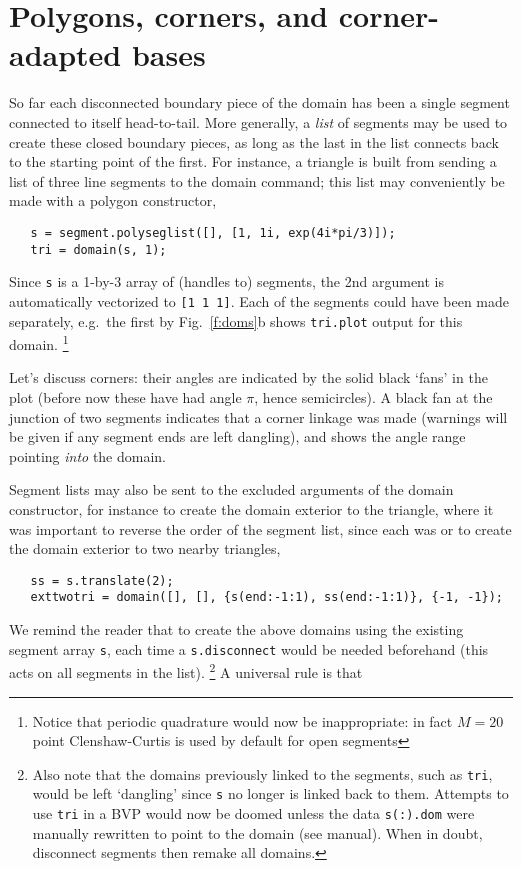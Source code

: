 \documentclass[11pt]{article}
\begin{document}
\section{Polygons, corners, and corner-adapted bases}
\label{s:poly}

So far each disconnected boundary piece of the domain
has been a single segment connected to itself head-to-tail.
More generally, a {\em list} of segments may be used to create 
these closed boundary pieces, as long as the last in the list
connects back to the starting point of the first.
For instance, a triangle is built from sending a list of
three line segments to the domain command;
this list may conveniently be made with a polygon constructor,
\begin{verbatim}
   s = segment.polyseglist([], [1, 1i, exp(4i*pi/3)]);
   tri = domain(s, 1);
\end{verbatim}
Since {\tt s} is a 1-by-3 array of (handles to) segments,
the 2nd argument is automatically vectorized to {\tt [1 1 1]}.
Each of the segments could have been made separately, e.g.\ the first by
Fig.~\ref{f:doms}b shows {\tt tri.plot} output for this domain.%
  \footnote{Notice that periodic quadrature would now be inappropriate:
    in fact $M=20$ point Clenshaw-Curtis is used by default for open
    segments}

Let's discuss corners: their angles are indicated by the solid black
`fans' in the plot (before now these have had angle $\pi$, hence semicircles).
A black fan at the junction of two segments indicates that a corner
linkage was made (warnings will be given if any segment ends are left
dangling), and shows the angle range pointing {\em into} the domain.

Segment lists may also be sent to the excluded arguments of the
domain constructor, for instance to create the domain exterior
to the triangle,
where it was important to reverse the order of the segment list,
since each was 
or to create the domain exterior to two nearby triangles,
\begin{verbatim}
   ss = s.translate(2);
   exttwotri = domain([], [], {s(end:-1:1), ss(end:-1:1)}, {-1, -1});
\end{verbatim}
We remind the reader that to create the above domains
using the existing segment array {\tt s}, each time a {\tt s.disconnect}
would be needed beforehand (this acts on all segments in the list).%
  \footnote{Also note that the domains previously linked to the segments, such
    as {\tt tri}, would be left `dangling' since {\tt s} no longer is linked
    back to them. Attempts to use {\tt tri} in a BVP would now be doomed
    unless the data {\tt s(:).dom} were manually rewritten to point to
    the domain (see manual). When in doubt, disconnect segments then remake
    all domains.}
A universal rule is that
\begin{center}\end{center}
\end{document}

